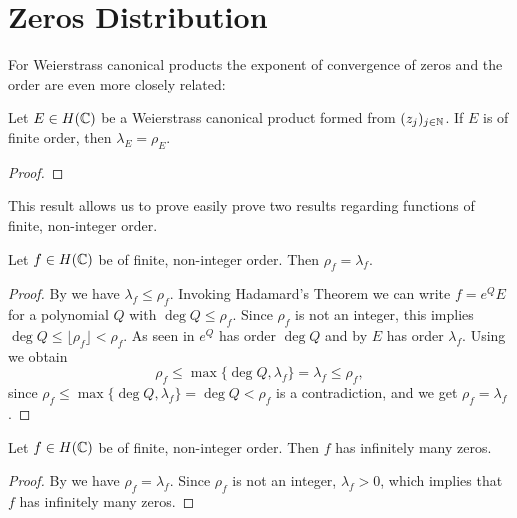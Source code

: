 \section{Zeros Distribution}
\label{sec:zeros}

For Weierstrass canonical products the exponent of convergence of zeros and the order are even more closely related:

\begin{theorem} \label{thm:exponent-of-convergence-weierstrass-product}
    Let $E \in H(\mathbb{C})$ be a Weierstrass canonical product formed from $(z_j)_{j \in \mathbb{N}}$. If $E$ is of finite order, then $\lambda_E = \rho_E$.
\end{theorem}

\begin{proof}
\end{proof}

This result allows us to prove easily prove two results regarding functions of finite, non-integer order.

\begin{theorem} \label{thm:finite-non-integer-order-equals-exponent-of-convergence}
    Let $f \in H(\mathbb{C})$ be of finite, non-integer order. Then $\rho_f = \lambda_f$.
\end{theorem}

\begin{proof}
    By  we have $\lambda_f \leq \rho_f$. Invoking Hadamard's Theorem we can write $f = e^Q E$ for a polynomial $Q$ with $\deg Q \leq \rho_f$. Since $\rho_f$ is not an integer, this implies $\deg Q \leq \lfloor \rho_f \rfloor < \rho_f$. As seen in  $e^Q$ has order $\deg Q$ and by  $E$ has order $\lambda_f$. Using  we obtain
    $$ \rho_f \leq \max \{ \deg Q, \lambda_f \} = \lambda_f \leq \rho_f, $$
    since $\rho_f \leq \max \{ \deg Q, \lambda_f \} = \deg Q < \rho_f$ is a contradiction, and we get $\rho_f = \lambda_f$.
\end{proof}

\begin{theorem} \label{thm:finite-non-integer-order-infinite-zeros}
    Let $f \in H(\mathbb{C})$ be of finite, non-integer order. Then $f$ has infinitely many zeros.
\end{theorem}

\begin{proof}
    By  we have $\rho_f = \lambda_f$. Since $\rho_f$ is not an integer, $\lambda_f > 0$, which implies that $f$ has infinitely many zeros.
\end{proof}

